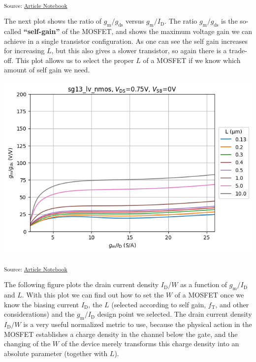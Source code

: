 \documentclass[
  a4paper,
  DIV=11,
  numbers=noendperiod]{scrartcl}
\begin{document}
\textsubscript{Source:
\href{https://iic-jku.github.io/analog-circuit-design/index.qmd.html}{Article
Notebook}}

The next plot shows the ratio of \(g_\mathrm{m}/ g_\mathrm{ds}\) versus
\(g_\mathrm{m}/I_\mathrm{D}\). The ratio \(g_\mathrm{m}/ g_\mathrm{ds}\)
is the so-called \textbf{``self-gain''} of the MOSFET, and shows the
maximum voltage gain we can achieve in a single transistor
configuration. As one can see the self gain increases for increasing
\(L\), but this also gives a slower transistor, so again there is a
trade-off. This plot allows us to select the proper \(L\) of a MOSFET if
we know which amount of self gain we need.

\includegraphics{index_files/figure-latex/.-sizing-techsweep_sg13_plots_nmos-cell-10-output-1.png}

\textsubscript{Source:
\href{https://iic-jku.github.io/analog-circuit-design/index.qmd.html}{Article
Notebook}}

The following figure plots the drain current density \(I_\mathrm{D}/W\)
as a function of \(g_\mathrm{m}/I_\mathrm{D}\) and \(L\). With this plot
we can find out how to set the \(W\) of a MOSFET once we know the
biasing current \(I_\mathrm{D}\), the \(L\) (selected according to self
gain, \(f_\mathrm{T}\), and other considerations) and the
\(g_\mathrm{m}/I_\mathrm{D}\) design point we selected. The drain
current density \(I_\mathrm{D}/W\) is a very useful normalized metric to
use, because the physical action in the MOSFET establishes a charge
density in the channel below the gate, and the changing of the \(W\) of
the device merely transforms this charge density into an absolute
parameter (together with \(L\)).
\end{document}
